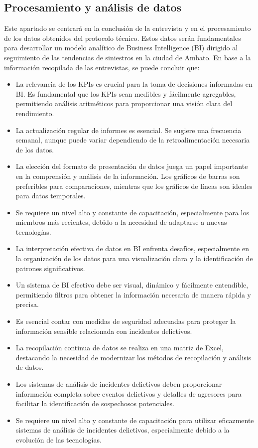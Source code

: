\subsection{Procesamiento y análisis de datos}

Este apartado se centrará en la conclusión de la entrevista y en el procesamiento de
los datos obtenidos del protocolo técnico. Estos datos serán fundamentales para desarrollar
un modelo analítico de Business Intelligence (BI) dirigido al seguimiento de las tendencias de
siniestros en la ciudad de Ambato.
\bigbreak
En base a la información recopilada de las entrevistas, se puede concluir que:

\begin{itemize}
    \item La relevancia de los KPIs es crucial para la toma de decisiones informadas en BI. Es fundamental que los KPIs sean medibles y fácilmente agregables, permitiendo análisis aritméticos para proporcionar una visión clara del rendimiento.
    \item La actualización regular de informes es esencial. Se sugiere una frecuencia semanal, aunque puede variar dependiendo de la retroalimentación necesaria de los datos.
    \item La elección del formato de presentación de datos juega un papel importante en la comprensión y análisis de la información. Los gráficos de barras son preferibles para comparaciones, mientras que los gráficos de líneas son ideales para datos temporales.
    \item Se requiere un nivel alto y constante de capacitación, especialmente para los miembros más recientes, debido a la necesidad de adaptarse a nuevas tecnologías.
    \item La interpretación efectiva de datos en BI enfrenta desafíos, especialmente en la organización de los datos para una visualización clara y la identificación de patrones significativos.
    \item Un sistema de BI efectivo debe ser visual, dinámico y fácilmente entendible, permitiendo filtros para obtener la información necesaria de manera rápida y precisa.
    \item Es esencial contar con medidas de seguridad adecuadas para proteger la información sensible relacionada con incidentes delictivos.
    \item La recopilación continua de datos se realiza en una matriz de Excel, destacando la necesidad de modernizar los métodos de recopilación y análisis de datos.
    \item Los sistemas de análisis de incidentes delictivos deben proporcionar información completa sobre eventos delictivos y detalles de agresores para facilitar la identificación de sospechosos potenciales.
    \item Se requiere un nivel alto y constante de capacitación para utilizar eficazmente sistemas de análisis de incidentes delictivos, especialmente debido a la evolución de las tecnologías.
\end{itemize}

